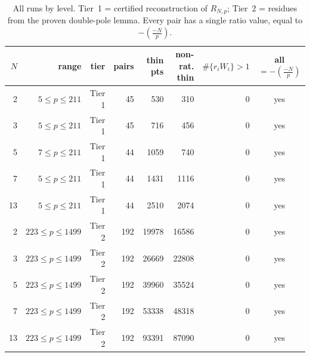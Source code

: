 \documentclass[11pt,a4paper]{article}
\numberwithin{equation}{section}
\theoremstyle{definition}
\theoremstyle{remark}
\begin{document}
\begin{table}[ht]\centering\small
\begin{tabular}{rrrrrrrc}
\toprule
$N$ & range & tier & pairs & thin pts & non-rat. thin & $\#\{r_iW_i\}>1$ & all $=-\left(\frac{-N}{p}\right)$\\
\midrule
2 & $5\le p\le 211$ & Tier 1 & 45 & 530 & 310 & 0 & yes\\
3 & $5\le p\le 211$ & Tier 1 & 45 & 716 & 456 & 0 & yes\\
5 & $7\le p\le 211$ & Tier 1 & 44 & 1059 & 740 & 0 & yes\\
7 & $5\le p\le 211$ & Tier 1 & 44 & 1431 & 1116 & 0 & yes\\
13 & $5\le p\le 211$ & Tier 1 & 44 & 2510 & 2074 & 0 & yes\\
2 & $223\le p\le 1499$ & Tier 2 & 192 & 19978 & 16586 & 0 & yes\\
3 & $223\le p\le 1499$ & Tier 2 & 192 & 26669 & 22808 & 0 & yes\\
5 & $223\le p\le 1499$ & Tier 2 & 192 & 39960 & 35524 & 0 & yes\\
7 & $223\le p\le 1499$ & Tier 2 & 192 & 53338 & 48318 & 0 & yes\\
13 & $223\le p\le 1499$ & Tier 2 & 192 & 93391 & 87090 & 0 & yes\\
\bottomrule
\end{tabular}
\caption{All runs by level. Tier~1 = certified reconstruction of $R_{N,p}$; Tier~2 = residues from the proven double-pole lemma. Every pair has a single ratio value, equal to $-\left(\frac{-N}{p}\right)$.}\label{tab:levels}
\end{table}
\end{document}
